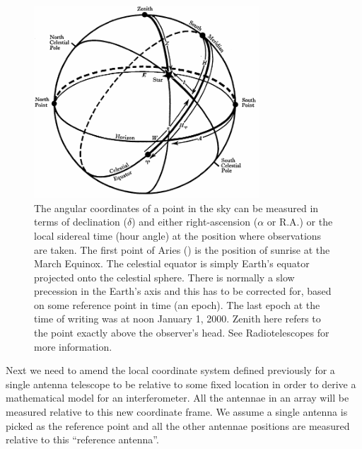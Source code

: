 \begin{figure}[h]
 \begin{mdframed}
 \centering
 \includegraphics[width=0.75\textwidth]{images/equatorial_coords.png}
 \caption[Equatorial coordinate system vs the local horizon]{The angular coordinates of a point in the sky can be measured in terms of declination ($\delta$) and either right-ascension ($\alpha$ or R.A.) or the local sidereal time (hour angle) at the position where
 observations are taken. The first point of Aries (\Aries) is the position of sunrise at the March Equinox. The celestial equator is simply Earth's equator projected onto the celestial sphere. There is normally a slow precession in the Earth's
 axis and this has to be corrected for, based on some reference point in time (an epoch). The last epoch at the time of writing was at noon January 1, 2000. Zenith here refers to the point exactly above the observer's head. See Radiotelescopes 
 \cite[Appendix 4]{christiansenradiotelescopes} for more information.}
  \label{fig_celestrial_coords}
 \end{mdframed}
\end{figure}

Next we need to amend the local coordinate system defined previously for a single antenna telescope to be relative to some fixed location in order to derive a mathematical model for an interferometer. 
All the antennae in an array will be measured relative to this new coordinate frame. We assume a single antenna is picked as the reference point and all the other antennae 
positions are measured relative to this ``reference antenna''. 

